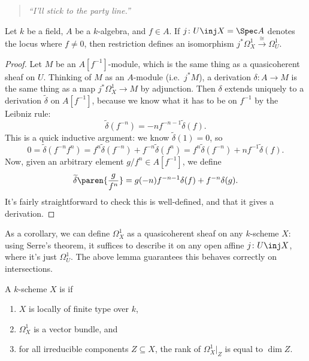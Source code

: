 \begin{quote}\textit{
	``I'll stick to the party line.''
}\end{quote}
\begin{lem}
Let $k$ be a field, $A$ be a $k$-algebra, and $f\in A$. If $j\colon U\inj X = \Spec A$ denotes the locus where
$f\ne 0$, then restriction defines an isomorphism $j^*\Omega_X^1\overset\cong\to\Omega_U^1$.
\end{lem}
\begin{proof}
Let $M$ be an $A[f^{-1}]$-module, which is the same thing as a quasicoherent sheaf on $U$. Thinking of $M$ as an
$A$-module (i.e.\ $j^*M$), a derivation $\delta\colon A\to M$ is the same thing as a map $j^*\Omega_X^1\to M$ by
adjunction. Then $\delta$ extends uniquely to a derivation $\widetilde\delta$ on $A[f^{-1}]$, because we know what
it has to be on $f^{-1}$ by the Leibniz rule:
\begin{equation}
	\widetilde\delta(f^{-n}) = -n f^{-n-1}\widetilde\delta(f).
\end{equation}
This is a quick inductive argument: we know $\widetilde\delta(1) = 0$, so
\begin{equation}
	0 = \widetilde\delta(f^{-n}f^n) = f^n\widetilde\delta(f^{-n}) + f^{-n}\widetilde\delta(f^n) =
	f^n\widetilde\delta(f^{-n}) + nf^{-1}\widetilde\delta(f).
\end{equation}
Now, given an arbitrary element $g/f^n\in A[f^{-1}]$, we define
\begin{equation}
	\widetilde\delta\paren{\frac{g}{f^n}} = g(-n)f^{-n-1}\delta(f) + f^{-n}\delta(g).
\end{equation}
It's fairly straightforward to check this is well-defined, and that it gives a derivation.
\end{proof}
As a corollary, we can define $\Omega_X^1$ as a quasicoherent sheaf on any $k$-scheme $X$: using Serre's theorem,
it suffices to describe it on any open affine $j\colon U\inj X$, where it's just $\Omega_U^1$. The above lemma
guarantees this behaves correctly on intersections.
\begin{defn}
\label{smoothdefn}
A $k$-scheme $X$ is  if
\begin{enumerate}
	\item $X$ is locally of finite type over $k$,
	\item $\Omega_X^1$ is a vector bundle, and
	\item for all irreducible components $Z\subseteq X$, the rank of $\Omega_X^1|_Z$ is equal to $\dim Z$.
\end{enumerate}
\end{defn}
